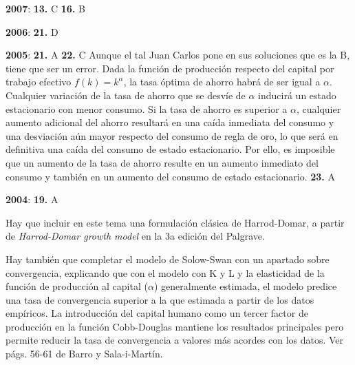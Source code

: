 \documentclass{nuevotema}
\begin{document}
\textbf{2007}: \textbf{13.} C \textbf{16.} B

\textbf{2006}: \textbf{21.} D

\textbf{2005}: \textbf{21.} A \textbf{22.} C Aunque el tal Juan Carlos pone en sus soluciones que es la B, tiene que ser un error. Dada la función de producción respecto del capital por trabajo efectivo $f(k) = k^\alpha$, la tasa óptima de ahorro habrá de ser igual a $\alpha$. Cualquier variación de la tasa de ahorro que se desvíe de $\alpha$ inducirá un estado estacionario con menor consumo. Si la tasa de ahorro es superior a $\alpha$, cualquier aumento adicional del ahorro resultará en una caída inmediata del consumo y una desviación aún mayor respecto del consumo de regla de oro, lo que será en definitiva una caída del consumo de estado estacionario. Por ello, es imposible que un aumento de la tasa de ahorro resulte en un aumento inmediato del consumo y también en un aumento del consumo de estado estacionario. \textbf{23.} A

\textbf{2004}: \textbf{19.} A


Hay que incluir en este tema una formulación clásica de Harrod-Domar, a partir de \textit{Harrod-Domar growth model} en la 3a edición del Palgrave.

Hay también que completar el modelo de Solow-Swan con un apartado sobre convergencia, explicando que con el modelo con K y L y la elasticidad de la función de producción al capital ($\alpha$) generalmente estimada, el modelo predice una tasa de convergencia superior a la que estimada a partir de los datos empíricos. La introducción del capital humano como un tercer factor de producción en la función Cobb-Douglas mantiene los resultados principales pero permite reducir la tasa de convergencia a valores más acordes con los datos. Ver págs. 56-61 de Barro y Sala-i-Martín.

\bibliografia
\end{document}
